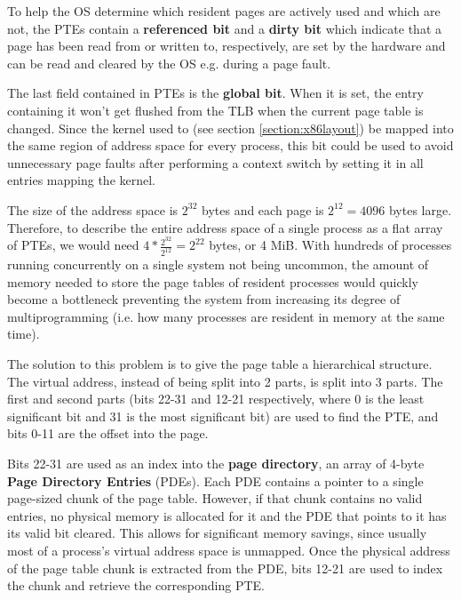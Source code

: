 \documentclass[shortabstract, english]{iithesis}
\begin{document}
To help the OS determine which resident pages are actively used and which are
not, the PTEs contain a \textbf{referenced bit} and a \textbf{dirty bit} which
indicate that a page has been read from or written to, respectively, are set by
the hardware and can be read and cleared by the OS e.g. during a page fault.

The last field contained in PTEs is the \textbf{global bit}. When it is set, the
entry containing it won't get flushed from the TLB when the current page table
is changed. Since the kernel used to (see section \ref{section:x86layout}) be
mapped into the same region of address space for every process, this bit could
be used to avoid unnecessary page faults after performing a context switch by
setting it in all entries mapping the kernel.

The size of the address space is $2^{32}$ bytes and each page is $2^{12} = 4096$
bytes large. Therefore, to describe the entire address space of a single process
as a flat array of PTEs, we would need $4 * \frac{2^{32}}{2^{12}} = 2^{22}$
bytes, or 4 MiB. With hundreds of processes running concurrently on a single
system not being uncommon, the amount of memory needed to store the page tables
of resident processes would quickly become a bottleneck preventing the system
from increasing its degree of multiprogramming (i.e. how many processes are
resident in memory at the same time).

The solution to this problem is to give the page table a hierarchical structure.
The virtual address, instead of being split into 2 parts, is split into 3 parts.
The first and second parts (bits 22-31 and 12-21 respectively, where 0 is the
least significant bit and 31 is the most significant bit) are used to find the
PTE, and bits 0-11 are the offset into the page.

Bits 22-31 are used as an index into the \textbf{page directory}, an array of
4-byte \textbf{Page Directory Entries} (PDEs). Each PDE contains a pointer to a
single page-sized chunk of the page table. However, if that chunk contains no
valid entries, no physical memory is allocated for it and the PDE that points to
it has its valid bit cleared. This allows for significant memory savings, since
usually most of a process's virtual address space is unmapped. Once the physical
address of the page table chunk is extracted from the PDE, bits 12-21 are used
to index the chunk and retrieve the corresponding PTE.
\end{document}
